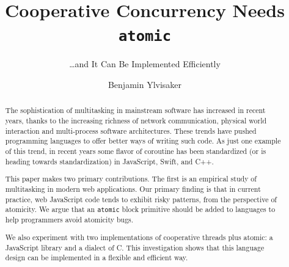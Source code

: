 \documentclass[sigplan,10pt,review,anonymous]{acmart}\settopmatter{printfolios=true,printccs=false,printacmref=false}
\begin{document}
\newcommand{\charcoal}{DblBlind}
\newcommand{\atomic}{\texttt{atomic}}

\setlength{\pdfpageheight}{\paperheight}
\setlength{\pdfpagewidth}{\paperwidth}


\title{Cooperative Concurrency Needs \texttt{atomic}}
\subtitle{\ldots and It Can Be Implemented Efficiently}


\author{Benjamin Ylvisaker}


\begin{abstract}

The sophistication of multitasking in mainstream software has increased in recent years, thanks to the increasing richness of network communication, physical world interaction and multi-process software architectures.
These trends have pushed programming languages to offer better ways of writing such code.
As just one example of this trend, in recent years some flavor of coroutine has been standardized (or is heading towards standardization) in JavaScript, Swift, and C++.

This paper makes two primary contributions.
The first is an empirical study of multitasking in modern web applications.
Our primary finding is that in current practice, web JavaScript code tends to exhibit risky patterns, from the perspective of atomicity.
We argue that an \texttt{atomic} block primitive should be added to languages to help programmers avoid atomicity bugs.

We also experiment with two implementations of cooperative threads plus atomic: a JavaScript library and a dialect of C.
This investigation shows that this language design can be implemented in a flexible and efficient way.

\end{abstract}
\end{document}
